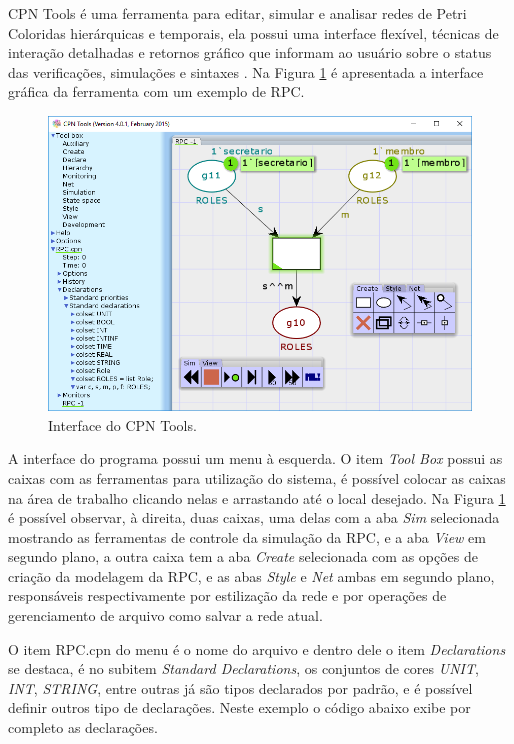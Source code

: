 CPN Tools é uma ferramenta para editar, simular e analisar redes de Petri Coloridas hierárquicas e temporais, ela possui uma interface flexível, técnicas de interação detalhadas e retornos gráfico que informam ao usuário sobre o status das verificações, simulações e sintaxes \cite{ratzer2003cpn}. Na Figura \ref{fig:cpn} é apresentada a interface gráfica da ferramenta com um exemplo de RPC.

\begin{figure}[ht]
\centering
\includegraphics[scale=0.7]{imagens/2-cpn.png}
\caption{Interface do CPN Tools.}
\label{fig:cpn}
\end{figure}

A interface do programa possui um menu à esquerda. O item \textit{Tool Box} possui as caixas com as ferramentas para utilização do sistema, é possível colocar as caixas na área de trabalho clicando nelas e arrastando até o local desejado. Na Figura \ref{fig:cpn} é possível observar, à direita, duas caixas, uma delas com a aba \textit{Sim} selecionada mostrando as ferramentas de controle da simulação da RPC, e a aba \textit{View} em segundo plano, a outra caixa tem a aba \textit{Create} selecionada com as opções de criação da modelagem da RPC, e as abas \textit{Style} e \textit{Net} ambas em segundo plano, responsáveis  respectivamente por estilização da rede e por operações de gerenciamento de arquivo como salvar a rede atual.

O item RPC.cpn do menu é o nome do arquivo e dentro dele o item \textit{Declarations} se destaca, é no subitem \textit{Standard Declarations}, os conjuntos de cores \textit{UNIT}, \textit{INT}, \textit{STRING}, entre outras já são tipos declarados por padrão, e é possível definir outros tipo de declarações. Neste exemplo o código abaixo exibe por completo as declarações.

